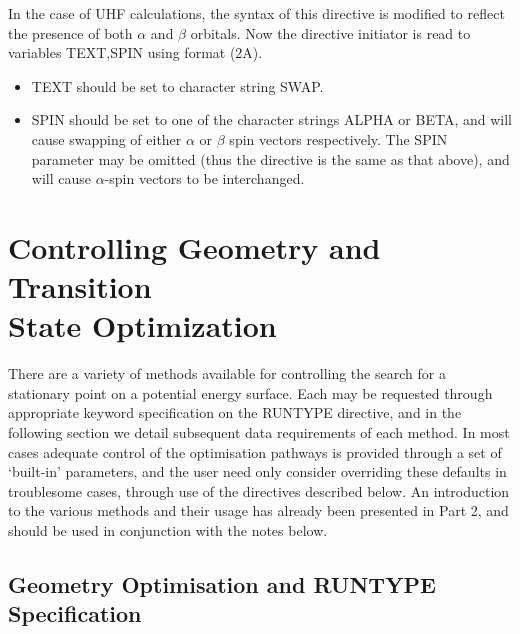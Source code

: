 \documentclass[11pt,fleqn]{article}
\begin{document}
In the case of UHF calculations,  the syntax of this directive is 
modified to reflect the presence of both $\alpha$ and $\beta$ orbitals.
Now the directive initiator is read to variables TEXT,SPIN
using format (2A).
\begin{itemize}
\item  TEXT should be set to character string SWAP.
\item  SPIN should be set to one of the character strings ALPHA or
BETA, and will cause swapping of either $\alpha$ or $\beta$ spin
vectors respectively. The SPIN parameter may be omitted
(thus the directive is the same as that above), and
will cause $\alpha$-spin vectors to be interchanged. 
\end{itemize}


\section[Controlling Geometry and Transition State Optimization]{Controlling Geometry and Transition \protect \\State Optimization}

There are a variety of methods available for controlling the
search for a stationary point on a potential energy surface. Each may
be requested through appropriate keyword specification
on the RUNTYPE directive, and in the following section we detail
subsequent data requirements of each method. 
In most cases  adequate control of the optimisation pathways 
is provided through a set of `built-in' parameters, and the
user need only consider overriding these defaults in
troublesome cases, through use of the  directives described below.
An introduction to the various
methods and their usage has already been presented in Part 2, and
should be used in conjunction with the notes below.

\subsection[Geometry Optimisation and RUNTYPE Specification]{Geometry Optimisation and RUNTYPE Specification}
\end{document}
